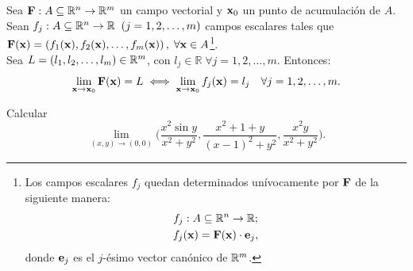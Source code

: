 \begin{propertie} \label{prop:lim_x_comp} 
Sea $\campoVec{F}: A \subseteq \Rn{n} \to \Rn{m}$ un campo vectorial y $\vect{x}_0$ un punto de acumulaci\'on de $A$. Sean $f_j: A \subseteq \mathbb{R}^n \to \mathbb{R} \;\; (j = 1,2, \dots, m)$ campos escalares tales que $\campoVec{F}(\vect{x}) = \left( f_1(\vect{x}), f_2(\vect{x}), \dots, f_m(\vect{x}) \right), \; \forall \vect{x} \in A$\footnote{Los campos escalares $f_j$ quedan determinados un\'ivocamente por $\campoVec{F}$ de la siguiente manera: 
\begin{gather*} 
f_j : A \subseteq \Rn{n} \to \mathbb{R}; \\ 
f_j(\vect{x}) = \campoVec{F}(\vect{x}) \cdot \vect{e}_j, 
\end{gather*} 
donde $\vect{e}_j$ es el $j$-\'esimo vector can\'onico de $\mathbb{R}^m$.}.\\ 
Sea $L = \left( l_1, l_2, \dots, l_m \right) \in \mathbb{R}^m$, con $l_j \in \mathbb{R} \; \forall j = 1,2, \dots, m$. Entonces:
\[ 
\lim_{\vect{x} \to \vect{x}_0} \campoVec{F}(\vect{x}) = L \iff \lim_{\vect{x} \to \vect{x}_0} f_j(\vect{x}) = l_j \quad \forall j = 1,2, \dots, m. 
\] 
\end{propertie}

\begin{tarea}Calcular
 \[
  \lim_{(x,y) \to (0,0)}   \Big( \frac{x^2 \sin y}{x^2 + y^2},  \frac{x^2 +1 +  y}{(x-1)^2 +  y^2}, \frac{x^2  y}{x^2 + y^2}   \Big).
 \]
\end{tarea}

